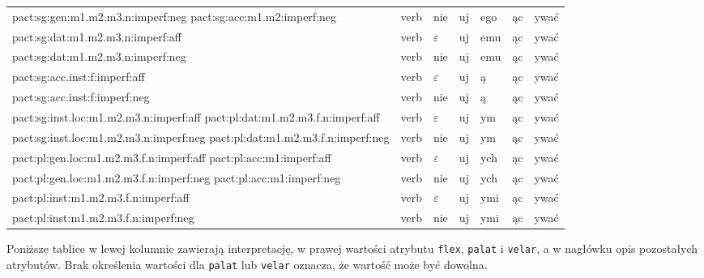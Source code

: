 \documentclass{article}
\begin{document}
\begin{longtable}{p{7cm}|l|l|l|l|l|l}
pact:sg:gen:m1.m2.m3.n:imperf:neg pact:sg:acc:m1.m2:imperf:neg & verb & nie & uj & ego & ąc & ywać\\
pact:sg:dat:m1.m2.m3.n:imperf:aff & verb & $\varepsilon$ & uj & emu & ąc & ywać\\
pact:sg:dat:m1.m2.m3.n:imperf:neg & verb & nie & uj & emu & ąc & ywać\\
pact:sg:acc.inst:f:imperf:aff & verb & $\varepsilon$ & uj & ą & ąc & ywać\\
pact:sg:acc.inst:f:imperf:neg & verb & nie & uj & ą & ąc & ywać\\
pact:sg:inst.loc:m1.m2.m3.n:imperf:aff pact:pl:dat:m1.m2.m3.f.n:imperf:aff & verb & $\varepsilon$ & uj & ym & ąc & ywać\\
pact:sg:inst.loc:m1.m2.m3.n:imperf:neg pact:pl:dat:m1.m2.m3.f.n:imperf:neg & verb & nie & uj & ym & ąc & ywać\\
pact:pl:gen.loc:m1.m2.m3.f.n:imperf:aff pact:pl:acc:m1:imperf:aff & verb & $\varepsilon$ & uj & ych & ąc & ywać\\
pact:pl:gen.loc:m1.m2.m3.f.n:imperf:neg pact:pl:acc:m1:imperf:neg & verb & nie & uj & ych & ąc & ywać\\
pact:pl:inst:m1.m2.m3.f.n:imperf:aff & verb & $\varepsilon$ & uj & ymi & ąc & ywać\\
pact:pl:inst:m1.m2.m3.f.n:imperf:neg & verb & nie & uj & ymi & ąc & ywać\\
\end{longtable}

Poniższe tablice w lewej kolumnie zawierają interpretację, w prawej wartości atrybutu \texttt{flex}, \texttt{palat} i \texttt{velar},
a w nagłówku opis pozostałych atrybutów. Brak określenia wartości dla \texttt{palat} lub \texttt{velar} oznacza, że wartość może być dowolna.
\end{document}
